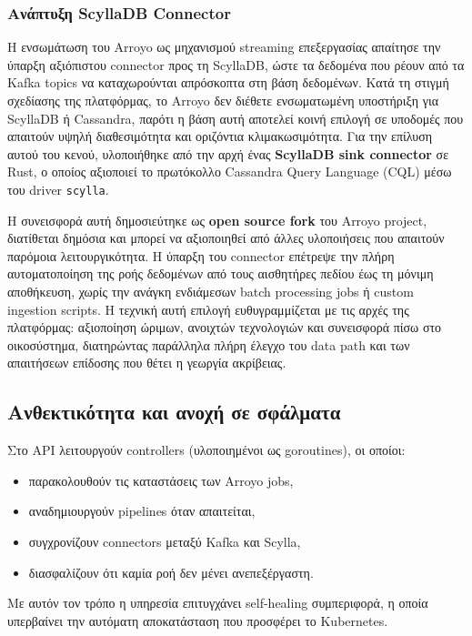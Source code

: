 \subsubsection{Ανάπτυξη ScyllaDB Connector}
Η ενσωμάτωση του Arroyo ως μηχανισμού streaming επεξεργασίας απαίτησε την
ύπαρξη αξιόπιστου connector προς τη ScyllaDB, ώστε τα δεδομένα που ρέουν από τα
Kafka topics να καταχωρούνται απρόσκοπτα στη βάση δεδομένων. Κατά τη στιγμή
σχεδίασης της πλατφόρμας, το Arroyo δεν διέθετε ενσωματωμένη υποστήριξη για
ScyllaDB ή Cassandra, παρότι η βάση αυτή αποτελεί κοινή επιλογή σε υποδομές που
απαιτούν υψηλή διαθεσιμότητα και οριζόντια κλιμακωσιμότητα. Για την επίλυση
αυτού του κενού, υλοποιήθηκε από την αρχή ένας \textbf{ScyllaDB sink connector}
σε Rust, ο οποίος αξιοποιεί το πρωτόκολλο Cassandra Query Language (CQL) μέσω
του driver \texttt{scylla}.

Η συνεισφορά αυτή δημοσιεύτηκε ως \textbf{open source fork} του Arroyo project,
διατίθεται δημόσια και μπορεί να αξιοποιηθεί από άλλες υλοποιήσεις που απαιτούν
παρόμοια λειτουργικότητα. Η ύπαρξη του connector επέτρεψε την πλήρη
αυτοματοποίηση της ροής δεδομένων από τους αισθητήρες πεδίου έως τη μόνιμη
αποθήκευση, χωρίς την ανάγκη ενδιάμεσων batch processing jobs ή custom
ingestion scripts. Η τεχνική αυτή επιλογή ευθυγραμμίζεται με τις αρχές της
πλατφόρμας: αξιοποίηση ώριμων, ανοιχτών τεχνολογιών και συνεισφορά πίσω στο
οικοσύστημα, διατηρώντας παράλληλα πλήρη έλεγχο του data path και των
απαιτήσεων επίδοσης που θέτει η γεωργία ακρίβειας.

\subsection{Ανθεκτικότητα και ανοχή σε σφάλματα}

Στο API λειτουργούν controllers (υλοποιημένοι ως goroutines), οι οποίοι:

\begin{itemize}
	\item παρακολουθούν τις καταστάσεις των Arroyo jobs,
	\item αναδημιουργούν pipelines όταν απαιτείται,
	\item συγχρονίζουν connectors μεταξύ Kafka και Scylla,
	\item διασφαλίζουν ότι καμία ροή δεν μένει ανεπεξέργαστη.
\end{itemize}

Με αυτόν τον τρόπο η υπηρεσία επιτυγχάνει self-healing συμπεριφορά, η οποία
υπερβαίνει την αυτόματη αποκατάσταση που προσφέρει το Kubernetes.

